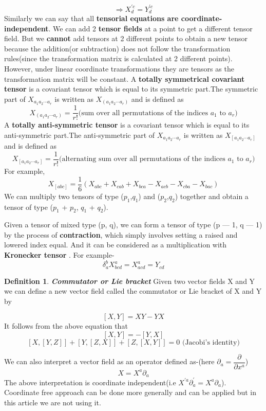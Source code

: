 \documentclass[12pt,a4paper]{article}
\numberwithin{table}{section}
\numberwithin{figure}{section}
\numberwithin{equation}{section}
\theoremstyle{remark}
\theoremstyle{definition}
\newtheorem{definition}{Definition}[section]
\begin{document}
$$\Rightarrow X^{'c}_{d}=Y^{'c}_{d}$$
Similarly we can say that all \textbf{tensorial equations are coordinate-independent}. We can add 2 \textbf{tensor fields} at a point to get a different tensor field. But we \textbf{cannot} add tensors at 2 different points to obtain a new tensor because the addition(or subtraction) does not follow the transformation rules(since the transformation matrix is calculated at 2 different points). However, under linear coordinate transformations they are tensors as the transformation matrix will be constant. 
A \textbf{totally symmetrical covariant tensor} is a covariant tensor  which is equal to its symmetric part.The symmetric part of $X_{a_1a_2\cdots a_r} $ is written as $X_{(a_1a_2\cdots a_r)}$ and is defined as
$$X_{(a_1a_2\cdots a_r)} =\dfrac{1}{r!}\text{(sum over all permutations of the indices $a_1$ to $a_r$)}$$
A \textbf{totally anti-symmetric tensor} is a covariant tensor  which is equal to its anti-symmetric part.The anti-symmetric part of $X_{a_1a_2\cdots a_r}$ is written as $X_{[a_1a_2\cdots a_r]} $ and is defined as
$$X_{[a_1a_2\cdots a_r]} =\dfrac{1}{r!}\text{(alternating sum over all permutations of the indices $a_1$ to $a_r$)}$$
For example,
$$X_{[abc]}=\dfrac{1}{6}(X_{abc}+X_{cab}+X_{bca}-X_{acb}-X_{cba}-X_{bac}) $$
We can multiply two tensors of type ($p_1$,$q_1$) and ($p_2$,$q_2$) together and obtain a tensor of type ($p_1$ + $p_2$, $q_1$ + $q_2$).

Given a tensor of mixed type (p, q), we can form a 
tensor of type (p — 1, q — 1) by the process of \textbf{contraction}, which simply involves setting a raised and lowered index equal. And it can be considered as a multiplication with \textbf{Kronecker tensor} . For example-
$$\delta^b_aX^a_{bcd}=X^a_{acd}=Y_{cd}$$

\begin{definition}{\textbf{\textit{Commutator or Lie bracket}}}
Given two vector fields X and Y we can define a new vector field called the 
commutator or Lie bracket of X and Y by 

$$[X, Y]=XY-YX $$
It follows from the above equation that
$$[X, Y]=-[Y, X] $$
$$[X, [Y, Z]]+[Y, [Z, X]]+[Z, [X, Y]]=0\text{ (Jacobi's identity)}  $$
\end{definition}
We can also interpret a vector field as an operator defined as-(here $\partial_a=\dfrac{\partial}{\partial x^a}$)
$$X=X^a\partial_a $$
The above interpretation is coordinate independent(i.e $X^{'a}\partial^{'}_{a} = X^a\partial_a $). Coordinate free approach can be done more generally and can be applied but in this article we are not using it.
\end{document}
